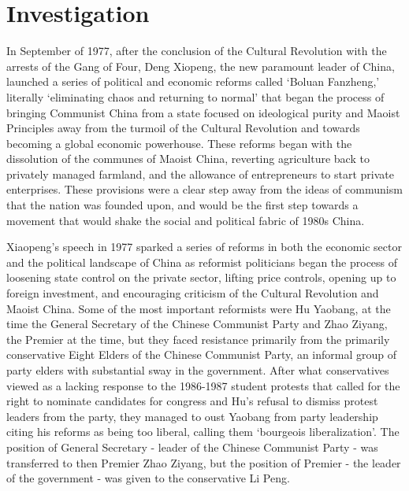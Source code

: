 \documentclass{paper}
\begin{document}
\section{Investigation}
\begin{doublespace}
In September of 1977, after the conclusion of the Cultural Revolution with the arrests of the Gang of Four, Deng Xiopeng, the new paramount leader of China, launched a series of political and economic reforms called ‘Boluan Fanzheng,’ literally ‘eliminating chaos and returning to normal’ that began the process of bringing Communist China from a state focused on ideological purity and Maoist Principles away from the turmoil of the Cultural Revolution and towards becoming a global economic powerhouse. These reforms began with the dissolution of the communes of Maoist China, reverting agriculture back to privately managed farmland, and the allowance of entrepreneurs to start private enterprises. These provisions were a clear step away from the ideas of communism that the nation was founded upon, and would be the first step towards a movement that would shake the social and political fabric of 1980s China.

Xiaopeng’s speech in 1977 sparked a series of reforms in both the economic sector and the political landscape of China as reformist politicians began the process of loosening state control on the private sector, lifting price controls, opening up to foreign investment, and encouraging criticism of the Cultural Revolution and Maoist China. Some of the most important reformists were Hu Yaobang, at the time the General Secretary of the Chinese Communist Party and Zhao Ziyang, the Premier at the time, but they faced resistance primarily from the primarily conservative Eight Elders of the Chinese Communist Party, an informal group of party elders with substantial sway in the government. After what conservatives viewed as a lacking response to the 1986-1987 student protests that called for the right to nominate candidates for congress and Hu’s refusal to dismiss protest leaders from the party, they managed to oust Yaobang from party leadership citing his reforms as being too liberal, calling them ‘bourgeois liberalization’. The position of General Secretary - leader of the Chinese Communist Party - was transferred to then Premier Zhao Ziyang, but the position of Premier - the leader of the government - was given to the conservative Li Peng.


\end{doublespace}
\end{document}
